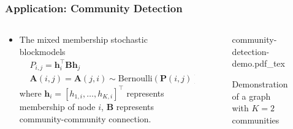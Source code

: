 \documentclass[10pt,xcolor={usenames,dvipsnames,table}]{beamer}
\def\blue{\color{blue}}
\newcommand{\T}{\!\top\!}
\newcommand{\incfig}[2][1]{%
    \def\svgwidth{#1\columnwidth}
    {#2.pdf_tex}
}
\newcommand{\citep}[1]{{\blue \scriptsize \parencite{#1}}}
\begin{document}
\begin{frame}
    \frametitle{Application: Community Detection}
    \begin{columns}
        \begin{column}{0.7\textwidth}
    \begin{itemize}
        \item The mixed membership stochastic blockmodels \citep{airoldi2008mixed}
    \begin{align*}
    &P_{i,j} = \bm{h}_i^{\T} \bm{B} \bm{h}_j \\
    & \bm{A}(i,j) = \bm{A}(j, i) \sim \text{Bernoulli}(\bm{P}(i, j))
    \end{align*} 
    where $\bm{h}_i= [h_{1,i}, \ldots , h_{K, i}]^{\T}$ represents membership of node $i$, $\bm{B}$ represents community-community connection.
    \end{itemize}
        \end{column}
        \begin{column}{0.3\textwidth}
        \begin{figure}
            \centering
    \resizebox{\textwidth}{!}
            { 
            \incfig{community-detection-demo} }
            \caption*{Demonstration of a graph with $K=2$ communities}
        \end{figure}
        \end{column}
    \end{columns}


\end{frame}
\end{document}
